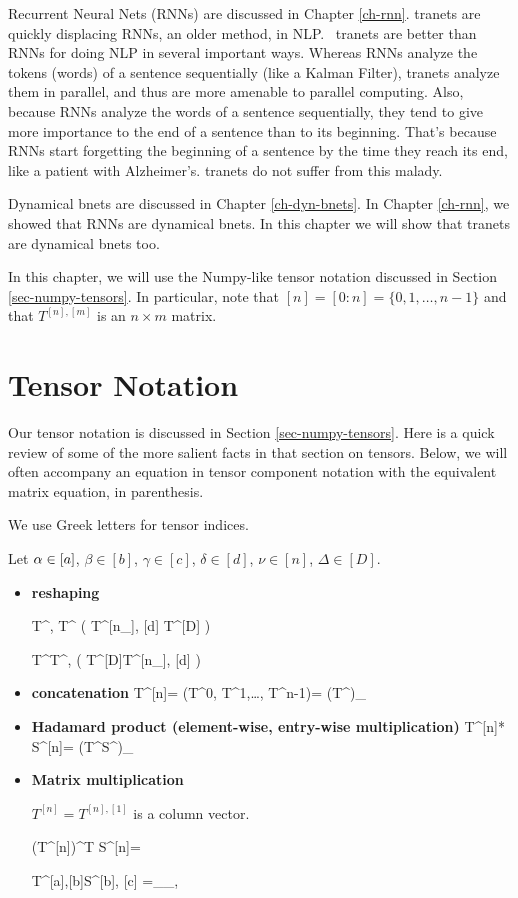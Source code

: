 Recurrent Neural Nets (RNNs)
are discussed in Chapter \ref{ch-rnn}.
tranets are quickly displacing RNNs,
an older method, in NLP.  tranets are better than RNNs
for doing NLP in several important ways. Whereas
 RNNs analyze the tokens (words) of a sentence
sequentially (like a Kalman Filter),
tranets analyze them in parallel, and thus are more
 amenable to parallel computing. Also, because
 RNNs analyze the words of a sentence sequentially,
they tend to give more importance to the end
of a sentence than to its beginning. That's because
RNNs start forgetting the beginning of a sentence
 by the time they reach its end, like a patient
with Alzheimer's. tranets do not suffer from this malady.

Dynamical bnets are discussed in Chapter \ref{ch-dyn-bnets}.
In Chapter \ref{ch-rnn},
we showed that RNNs
are dynamical bnets.
In this chapter
 we will show that tranets
are dynamical bnets too.


In this chapter, we
will use the Numpy-like tensor notation
discussed in Section
\ref{sec-numpy-tensors}. In particular, note that $[n] = [0:n] = \{0, 1,\ldots, n-1\}$ and that $T^{[n], [m]}$ is an $n\times m$ matrix.

\section{Tensor Notation}
Our tensor notation is discussed in Section
\ref{sec-numpy-tensors}.
Here is a quick review
of some of the more salient
facts in that section on tensors.
Below, we will often accompany
  an equation in tensor
  component notation
  with the equivalent matrix equation,
  in parenthesis.

We use
Greek letters for
tensor indices.

Let $\alpha\in[a]$, $\beta\in[b]$, $\gamma\in[c]$,
$\delta \in[d]$,
$\nu\in[n]$, $\Delta\in[D]$.


\begin{itemize}

\item{\bf reshaping}

\beq
T^{\nu, \delta}\rarrow T^{\Delta}
\;\;
\left(
T^{[n_\rvh], [d]} \rarrow T^{[D]}
\right)
\eeq

\beq
T^{\Delta}\rarrow T^{\nu, \delta}
\;\;
\left(
T^{[D]}\rarrow T^{[n_\rvh], [d]}
\right)
\eeq

\item {\bf concatenation}
\beq
T^{[n]}= (T^0, T^1,\ldots, T^{n-1})=
(T^\nu)_{\nu\in[n]}
\eeq

\item {\bf Hadamard product (element-wise, entry-wise multiplication)}
\beq
T^{[n]}* S^{[n]}= (T^\nu S^\nu)_{\nu\in[n]}
\eeq


\item {\bf Matrix multiplication}

$T^{[n]}= T^{[n], [1]}$ is a column vector.

\beq
(T^{[n]})^T S^{[n]}=
\eeq

\beq
T^{[a],[b]}S^{[b], [c]}
=
_{\alp_\in [a], \gamma \in [c]}
\eeq

\end{itemize}

